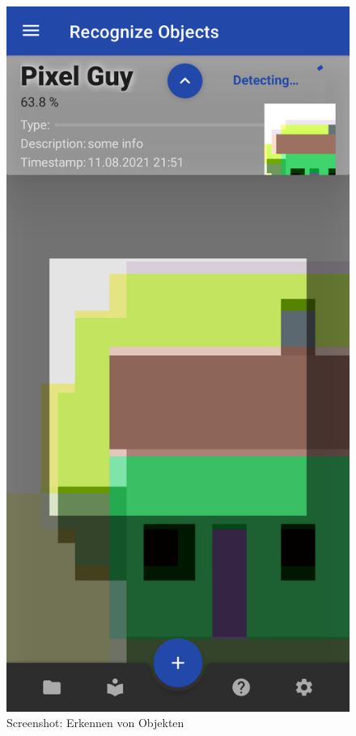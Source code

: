 \documentclass[oneside]{ausarbeitung}
\begin{document}
\begin{figure}[hptb]
	\centering
	\includegraphics[height=0.6\textheight]{images/screenshots/detecting.png}
	\caption{Screenshot: Erkennen von Objekten}
	\label{fig:screenshot:detecting}
\end{figure}
\end{document}
